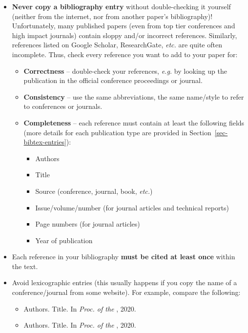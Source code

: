 \documentclass[11pt,a4paper]{article}
\begin{document}
\begin{itemize}
\item \textbf{Never copy a bibliography entry} without double-checking it yourself (neither from the internet, nor from another paper's bibliography)! Unfortunately, many published papers (even from top tier conferences and high impact journals) contain sloppy and/or incorrect references. Similarly, references listed on Google Scholar, ResearchGate, \emph{etc.} are quite often incomplete. Thus, check every reference you want to add to your paper for:
%
\vspace{-0.25cm}
%
\begin{itemize}
\item \textbf{Correctness} -- double-check your references, \emph{e.g.} by looking up the publication in the official conference proceedings or journal.
\item \textbf{Consistency} -- use the same abbreviations, the same name/style to refer to conferences or journals.
\item \textbf{Completeness} -- each reference must contain at least the following fields (more details for each publication type are provided in Section~\ref{sec-bibtex-entries}):
%
%
\begin{itemize}[label=$\bullet$]
\item Authors
\item Title
\item Source (conference, journal, book, \emph{etc.})
\item Issue/volume/number (for journal articles and technical reports)
\item Page numbers (for journal articles)
\item Year of publication
\end{itemize}
\end{itemize}

\item Each reference in your bibliography \textbf{must be cited at least once} within the text.

\item Avoid lexicographic entries (this usually happens if you copy the name of a conference/journal from some website). For example, compare the following:
%
\vspace{-0.25cm}
%
\begin{itemize}
\item Authors. Title. In \emph{Proc. of the }, 2020.
\item Authors. Title. In \emph{Proc. of the }, 2020.
\end{itemize}


\end{itemize}
\end{document}
